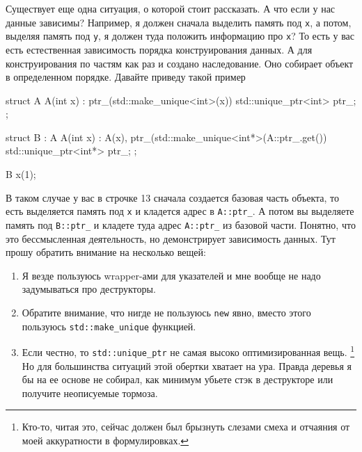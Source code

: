 Существует еще одна ситуация, о которой стоит рассказать.
А что если у нас данные зависимы?
Например, я должен сначала выделить память под \verb"x", а потом, выделяя память под \verb"y", я должен туда положить информацию про \verb"x"?
То есть у вас есть естественная зависимость порядка конструирования данных.
А для конструирования по частям как раз и создано наследование.
Оно собирает объект в определенном порядке.
Давайте приведу такой пример
\begin{cppcode}
struct A {
  A(int x) : ptr_(std::make_unique<int>(x)) {}
  std::unique_ptr<int> ptr_;
};

struct B : A {
  A(int x)
   : A(x),
     ptr_(std::make_unique<int*>(A::ptr_.get()) {}
   std::unique_ptr<int*> ptr_;
};

B x(1);
\end{cppcode}
В таком случае у вас в строчке 13 сначала создается базовая часть объекта, то есть выделяется память под \verb"x" и кладется адрес в \verb"A::ptr_".
А потом вы выделяете память под \verb"B::ptr_" и кладете туда адрес \verb"A::ptr_" из базовой части.
Понятно, что это бессмысленная деятельность, но демонстрирует зависимость данных.
Тут прошу обратить внимание на несколько вещей:
\begin{enumerate}
\item Я везде пользуюсь wrapper-ами для указателей и мне вообще не надо задумываться про деструкторы.

\item Обратите внимание, что нигде не пользуюсь \verb"new" явно, вместо этого пользуюсь \verb"std::make_unique" функцией.

\item Если честно, то \verb"std::unique_ptr" не самая высоко оптимизированная вещь.%
\footnote{Кто-то, читая это, сейчас должен был брызнуть слезами смеха и отчаяния от моей аккуратности в формулировках.}
Но для большинства ситуаций этой обертки хватает на ура.
Правда деревья я бы на ее основе не собирал, как минимум убьете стэк в деструкторе или получите неописуемые тормоза.
\end{enumerate}

